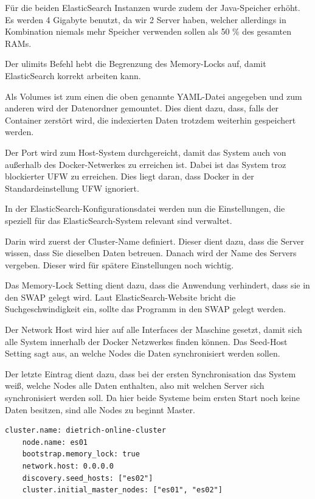 Für die beiden ElasticSearch Instanzen wurde zudem der Java-Speicher erhöht. Es werden 4 Gigabyte benutzt, da wir 2 Server haben, welcher allerdings in Kombination niemals mehr Speicher verwenden sollen als 50 \% des gesamten RAMs. \cite{ElasticsearchB.V..12172019}

Der ulimits Befehl hebt die Begrenzung des Memory-Locks auf, damit ElasticSearch korrekt arbeiten kann.

Als Volumes ist zum einen die oben genannte YAML-Datei angegeben und zum anderen wird der Datenordner gemountet. Dies dient dazu, dass, falls der Container zerstört wird, die indexierten Daten trotzdem weiterhin gespeichert werden.

Der Port wird zum Host-System durchgereicht, damit das System auch von außerhalb des Docker-Netwerkes zu erreichen ist. Dabei ist das System troz blockierter UFW zu erreichen. Dies liegt daran, dass Docker in der Standardeinstellung UFW ignoriert.

In der ElasticSearch-Konfigurationsdatei werden nun die Einstellungen, die speziell für das ElasticSearch-System relevant sind verwaltet. 

Darin wird zuerst der Cluster-Name definiert. Dieser dient dazu, dass die Server wissen, dass Sie dieselben Daten betreuen. 
Danach wird der Name des Servers vergeben. Dieser wird für spätere Einstellungen noch wichtig.

Das Memory-Lock Setting dient dazu, dass die Anwendung verhindert, dass sie in den SWAP gelegt wird. Laut ElasticSearch-Website bricht die Suchgeschwindigkeit ein, sollte das Programm in den SWAP gelegt werden.

Der Network Host wird hier auf alle Interfaces der Maschine gesetzt, damit sich alle System innerhalb der Docker Netzwerkes finden können.
Das Seed-Host Setting sagt aus, an welche Nodes die Daten synchronisiert werden sollen.

Der letzte Eintrag dient dazu, dass bei der ersten Synchronisation das System weiß, welche Nodes alle Daten enthalten, also mit welchen Server sich synchronisiert werden soll. Da hier beide Systeme beim ersten Start noch keine Daten besitzen, sind alle Nodes zu beginnt Master. 
\begin{lstlisting}[language=XML, frame=single, label={lst:es01-yml}] 
	cluster.name: dietrich-online-cluster
	node.name: es01
	bootstrap.memory_lock: true
	network.host: 0.0.0.0
	discovery.seed_hosts: ["es02"]
	cluster.initial_master_nodes: ["es01", "es02"]
\end{lstlisting}

